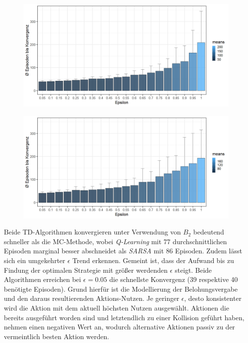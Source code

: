 \begin{figure}[H]
    \centering
    \begin{minipage}{.5\textwidth}
      \centering
      \includegraphics[width=\textwidth]{images/SimpleZ2B2QLearningA}
      \label{fig:test1}
    \end{minipage}%
    \begin{minipage}{.5\textwidth}
      \centering
      \includegraphics[width=\textwidth]{images/SimpleZ2B2SarsaA}
      \label{fig:test2}
    \end{minipage}
\end{figure}
Beide TD-Algorithmen konvergieren unter Verwendung von $B_2$ bedeutend schneller als die MC-Methode, wobei \textit{Q-Learning} mit 77 durchschnittlichen Episoden marginal besser abschneidet als \textit{SARSA} mit 86 Episoden. Zudem lässt sich ein umgekehrter $\epsilon$ Trend erkennen. Gemeint ist, dass der Aufwand bis zu Findung der optimalen Strategie mit größer werdenden $\epsilon$ steigt. Beide Algorithmen erreichen bei $\epsilon = 0.05$ die schnellste Konvergenz (39 respektive 40 benötigte Episoden). Grund hierfür ist die Modellierung der Belohungsvergabe und den daraus resultierenden Aktions-Nutzen. Je geringer $\epsilon$, desto konsistenter wird die Aktion mit dem aktuell höchsten Nutzen ausgewählt. Aktionen die bereits  ausgeführt worden sind und letztendlich zu einer Kollision geführt haben, nehmen einen negativen Wert an, wodurch alternative Aktionen passiv zu der vermeintlich besten Aktion werden. 
\par 

